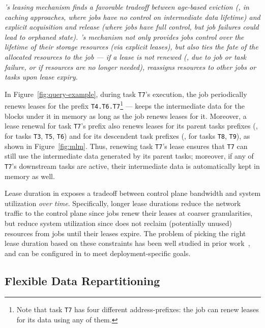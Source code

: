 \sl's leasing mechanism finds a favorable tradeoff between age-based eviction (\eg, in caching approaches, where jobs have no control on intermediate data lifetime) and explicit acquisition and release (where jobs have full control, but job failures could lead to orphaned state). \sl's mechanism not only provides jobs control over the lifetime of their storage resources (via explicit leases), but also ties the fate of the allocated resources to the job --- if a lease is not renewed (\eg, due to job or task failure, or if resources are no longer needed), \jiffy reassigns resources to other jobs or tasks upon lease expiry.

 In Figure~\ref{fig:query-example}, during task \texttt{T7}'s execution, the job periodically renews leases for the prefix \texttt{T4.T6.T7}\footnote{Note that task \texttt{T7} has four different address-prefixes: the job can renew leases for its data using any of them.} --- \jiffy keeps the intermediate data for the blocks under it in memory as long as the job renews leases for it. Moreover, a lease renewal for task \texttt{T7}'s prefix also renews leases for its parent tasks prefixes (\ie, for tasks \texttt{T3}, \texttt{T5}, \texttt{T6}) and for its descendent task prefixes (\ie, for tasks \texttt{T8}, \texttt{T9}), as shown in Figure~\ref{fig:mlm}. Thus, renewing task \texttt{T7}'s lease ensures that \texttt{T7} can still use the intermediate data generated by its parent tasks; moreover, if any of \texttt{T7}'s downstream tasks are active, their intermediate data is automatically kept in memory as well.



 Lease duration in \jiffy exposes a tradeoff between control plane bandwidth and system utilization \textit{over time}. Specifically, longer lease durations reduce the network traffic to the control plane since jobs renew their leases at coarser granularities, but reduce system utilization since \jiffy does not reclaim (potentially unused) resources from jobs until their leases expire. The problem of picking the right lease duration based on these constraints has been well studied in prior work~\cite{chubby, gray1989leases}, and can be configured in \jiffy to meet deployment-specific goals.


\subsection{Flexible Data Repartitioning}
\label{ssec:fdr}

